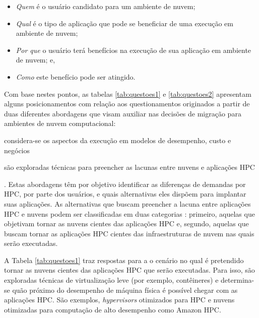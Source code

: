\documentclass[tese,capa]{texufpel}
\begin{document}
\begin{itemize}[noitemsep]
    \item \emph{Quem} é o usuário candidato para um ambiente de nuvem;
    \item \emph{Qual} é o tipo de aplicação que pode se beneficiar de uma execução em ambiente de nuvem;
    \item \emph{Por que} o usuário terá benefícios na execução de sua aplicação em ambiente de nuvem; e,
    \item \emph{Como} este benefício pode ser atingido.
\end{itemize}

Com base nestes pontos, as tabelas \ref{tab:questoes1} e \ref{tab:questoes2} apresentam alguns posicionamentos com relação aos questionamentos originados a partir de duas diferentes abordagens que visam auxiliar nas decisões de migração para ambientes de nuvem computacional: 
\begin{enumerate*}[label=\textit{\alph*}),itemjoin={{; }},itemjoin*={{; e }}]
  \item considera-se os aspectos da execução em modelos de desempenho, custo e negócios
  \item são exploradas técnicas para preencher as lacunas entre nuvens e aplicações HPC
\end{enumerate*}. Estas abordagens têm por objetivo identificar as diferenças de demandas por HPC, por parte dos usuários, e quais alternativas eles dispõem para implantar suas aplicações. As alternativas que buscam preencher a lacuna entre aplicações HPC e nuvens podem ser classificadas em duas categorias \cite{guptaEvaluatingImprovingPerformance2016d}: primeiro, aquelas que objetivam tornar as nuvens cientes das aplicações HPC e, segundo, aquelas que buscam tornar as aplicações HPC cientes das infraestruturas de nuvem nas quais serão executadas.

A Tabela \ref{tab:questoes1} traz respostas para a o cenário no qual é pretendido tornar as nuvens cientes das aplicações HPC que serão executadas. Para isso, são exploradas técnicas de virtualização leve (por exemplo, contêineres) e determina-se quão próximo do desempenho de máquina física é possível chegar com as aplicações HPC. São exemplos, \textit{hypervisors} otimizados para HPC e nuvens otimizadas para computação de alto desempenho como Amazon HPC.
\end{document}
